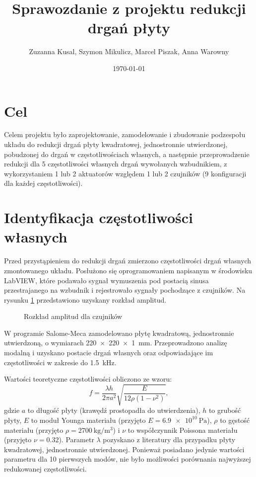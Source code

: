 \documentclass[polish,a4paper,11pt]{mwart}
\date{\today}
\author{Zuzanna Kusal, Szymon Mikulicz, Marcel Piszak, Anna Warowny}
\title{Sprawozdanie z projektu redukcji drgań płyty}
\let\Oldsection\section
\renewcommand{\section}{\FloatBarrier\Oldsection}
\begin{document}
\maketitle

\section{Cel}

Celem projektu było zaprojektowanie, zamodelowanie i zbudowanie podzespołu
układu do redukcji drgań płyty kwadratowej, jednostronnie utwierdzonej,
pobudzonej do drgań w częstotliwościach własnych, a następnie przeprowadzenie
redukcji dla 5 częstotliwości własnych drgań wywołanych wzbudnikiem, z
wykorzystaniem 1 lub 2 aktuatorów względem 1 lub 2 czujników (9 konfiguracji
dla każdej częstotliwości).

\section{Identyfikacja częstotliwości własnych} \label{ident}

Przed przystąpieniem do redukcji drgań zmierzono częstotliwości drgań własnych
zmontowanego układu. Posłużono się oprogramowaniem napisanym w środowisku
LabVIEW\texttrademark, które podawało sygnał wymuszenia pod postacią sinusa
przestrajanego na wzbudnik i rejestrowało sygnały pochodzące z czujników. Na
rysunku \ref{fig:mody} przedstawiono uzyskany rozkład amplitud.

\begin{figure}[!tbh]
  
  \caption{Rozkład amplitud dla czujników}
  \label{fig:mody}
\end{figure}

W programie Salome-Meca zamodelowano płytę kwadratową, jednostronnie
utwierdzoną, o wymiarach \SI{220 x 220 x 1}{\milli\meter}. Przeprowadzono analizę
modalną i uzyskano postacie drgań własnych  oraz odpowiadające im
częstotliwości w zakresie do \SI{1.5}{\kilo\hertz}.

Wartości teoretyczne częstotliwości obliczono ze wzoru:
\begin{equation}
  f = \frac{\lambda h}{2 \pi a^2}\sqrt{\frac{E}{12 \rho \left( 1-\nu^2
  \right)}},
\end{equation}
gdzie $a$ to długość płyty (krawędź prostopadła do utwierdzenia), $h$ to grubość
płyty, $E$ to moduł Younga materiału (przyjęto $E=\SI{6.9e10}{\pascal}$), $\rho$
to gęstość materiału (przyjęto $\rho=\SI{2700}{\kilogram\per\cubic\metre}$) i
$\nu$ to współczynnik Poissona materiału (przyjęto $\nu =\num{0.32}$). Parametr
$\lambda$ pozyskano z literatury \cite{Leissa}
dla przypadku płyty kwadratowej, jednostronnie utwierdzonej. Ponieważ posiadano
jedynie wartości parametru dla 10 pierwszych modów, nie było możliwości
porównania najwyższej redukowanej częstotliwości. 
\end{document}
